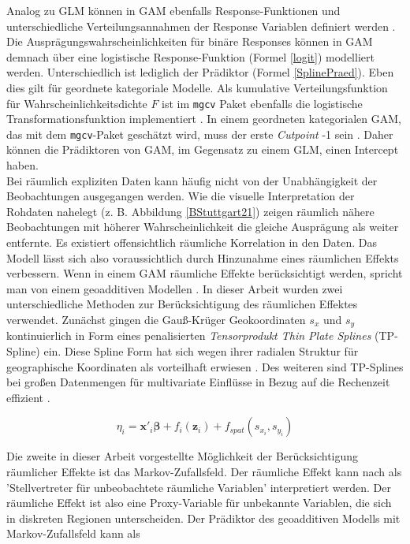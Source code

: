 \documentclass{Vorlage}
\begin{document}
Analog zu GLM können in GAM ebenfalls Response-Funktionen und unterschiedliche Verteilungsannahmen der Response Variablen definiert werden \cite[p. 448]{fahrmeir2013regression}. Die Ausprägungswahrscheinlichkeiten für binäre Responses können in GAM demnach über eine logistische Response-Funktion (Formel \ref{logit}) modelliert werden. Unterschiedlich ist lediglich der Prädiktor (Formel \ref{SplinePraed}). Eben dies gilt für geordnete kategoriale Modelle. Als kumulative Verteilungsfunktion für Wahrscheinlichkeitsdichte $F$ ist im \texttt{mgcv} Paket ebenfalls die logistische Transformationsfunktion implementiert \cite[p. 22]{wood2016}. In einem geordneten kategorialen GAM, das mit dem \texttt{mgcv}-Paket geschätzt wird, muss der erste \textit{Cutpoint} -1 sein \cite[p. 22]{wood2016}. Daher können die Prädiktoren von GAM, im Gegensatz zu einem GLM, einen Intercept haben.\\
Bei räumlich expliziten Daten kann häufig nicht von der Unabhängigkeit der Beobachtungen ausgegangen werden. Wie die visuelle Interpretation der Rohdaten nahelegt (z. B. Abbildung \ref{BStuttgart21}) zeigen räumlich nähere Beobachtungen mit höherer Wahrscheinlichkeit die gleiche Ausprägung als weiter entfernte. Es existiert offensichtlich räumliche Korrelation in den Daten. Das Modell lässt sich also voraussichtlich durch Hinzunahme eines räumlichen Effekts verbessern. Wenn in einem GAM räumliche Effekte berücksichtigt werden, spricht man von einem geoadditiven Modellen \cite[p. 540]{fahrmeir2013regression}. In dieser Arbeit wurden zwei unterschiedliche Methoden zur Berücksichtigung des räumlichen Effektes verwendet. Zunächst gingen die Gauß-Krüger Geokoordinaten $s_x$ und $s_y$ kontinuierlich in Form eines penalisierten \textit{Tensorprodukt Thin Plate Splines} (TP-Spline) ein. Diese Spline Form hat sich wegen ihrer radialen Struktur für geographische Koordinaten als vorteilhaft erwiesen \cite[p. 354]{gu1993}. Des weiteren sind TP-Splines bei großen Datenmengen für multivariate Einflüsse in Bezug auf die Rechenzeit effizient \cite[p. 95 f.]{wood2003}.

\begin{equation}
\eta_{i} =\mathbf{x}'_i \boldsymbol{\beta}+f_{i}(\mathbf{z}_{i})+f_{spat}(s_{x_i},s_{y_i})
\end{equation}

Die zweite in dieser Arbeit vorgestellte Möglichkeit der Berücksichtigung räumlicher Effekte ist das Markov-Zufallsfeld. Der räumliche Effekt kann nach \cite[p. 541]{fahrmeir2013regression} als 'Stellvertreter für unbeobachtete räumliche Variablen' interpretiert werden. Der räumliche Effekt ist also eine Proxy-Variable für unbekannte Variablen, die sich in diskreten Regionen unterscheiden. Der Prädiktor des geoadditiven Modells mit Markov-Zufallsfeld kann als
\end{document}
